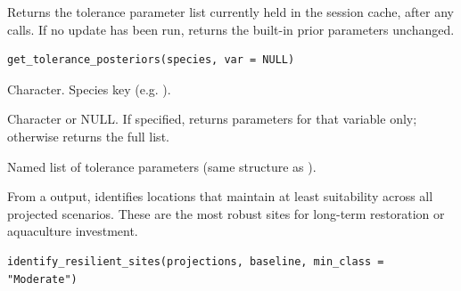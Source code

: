 \documentclass[a4paper]{book}
\begin{document}
%
\begin{Description}
Returns the tolerance parameter list currently held in the session cache,
after any  calls. If no update has been run,
returns the built-in prior parameters unchanged.
\end{Description}
%
\begin{Usage}
\begin{verbatim}
get_tolerance_posteriors(species, var = NULL)
\end{verbatim}
\end{Usage}
%
\begin{Arguments}
\begin{ldescription}
\item[\code{species}] Character. Species key (e.g. ).

\item[\code{var}] Character or NULL. If specified, returns parameters for that
variable only; otherwise returns the full  list.
\end{ldescription}
\end{Arguments}
%
\begin{Value}
Named list of tolerance parameters (same structure as
).
\end{Value}
%
\begin{Examples}
\end{Examples}
%
\begin{Description}
From a  output, identifies locations that maintain
at least  suitability across all projected scenarios. These are
the most robust sites for long-term restoration or aquaculture investment.
\end{Description}
%
\begin{Usage}
\begin{verbatim}
identify_resilient_sites(projections, baseline, min_class = "Moderate")
\end{verbatim}
\end{Usage}
\end{document}
